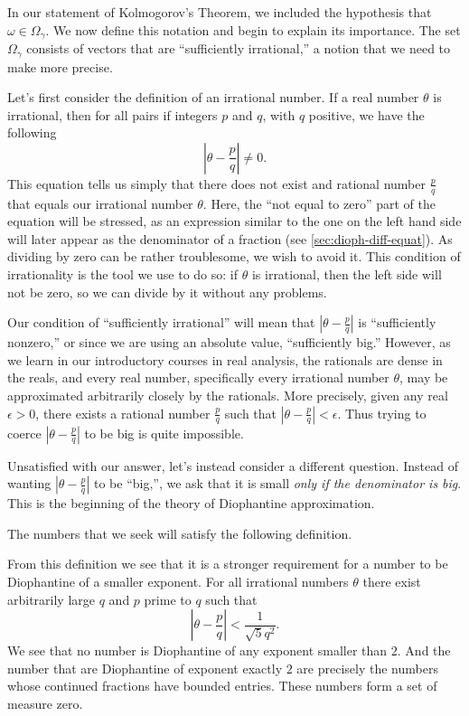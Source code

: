 \documentclass[twoside,letterpaper,10pt]{article}
\begin{document}
In our statement of Kolmogorov's Theorem, we included the hypothesis that
$\omega \in \Omega_{\gamma}$.
We now define this notation and begin to explain its importance.
The set $\Omega_{\gamma}$ consists of vectors that are ``sufficiently
irrational,'' a notion that we need to make more precise.

Let's first consider the definition of an irrational number.
If a real number $\theta$ is irrational, then for all pairs if integers $p$ and
$q$, with $q$ positive, we have the following
\begin{equation*}
  \left| \theta - \frac{p}{q} \right| \neq 0.
\end{equation*}
This equation tells us simply that there does not exist and rational number
$\frac{p}{q}$ that equals our irrational number $\theta$.
Here, the ``not equal to zero'' part of the equation will be stressed, as an
expression similar to the one on the left hand side will later appear as the
denominator of a fraction (see \cref{sec:dioph-diff-equat}).
As dividing by zero can be rather troublesome, we wish to avoid it.
This condition of irrationality is the tool we use to do so: if $\theta$ is
irrational, then the left side will not be zero, so we can divide by it without
any problems.

Our condition of ``sufficiently irrational'' will mean that $\left| \theta -
  \frac{p}{q} \right|$ is ``sufficiently nonzero,'' or since we are using an
absolute value, ``sufficiently big.''
However, as we learn in our introductory courses in real analysis, the rationals
are dense in the reals, and every real number, specifically every irrational
number $\theta$, may be approximated arbitrarily closely by the rationals.
More precisely, given any real $\epsilon > 0$, there exists a rational number
$\frac{p}{q}$ such that $\left| \theta - \frac{p}{q} \right| < \epsilon$.
Thus trying to coerce $\left| \theta - \frac{p}{q} \right|$ to be big is quite
impossible.

Unsatisfied with our answer, let's instead consider a different question.
Instead of wanting $\left| \theta - \frac{p}{q} \right|$ to be ``big,'', we ask
that it is small \emph{only if the denominator is big}.
This is the beginning of the theory of Diophantine approximation.

The numbers that we seek will satisfy the following definition.
\begin{defn}
  \dionumber{}
\end{defn}
From this definition we see that it is a stronger requirement for a number to be
Diophantine of a smaller exponent.
For all irrational numbers $\theta$ there exist arbitrarily large $q$ and $p$
prime to $q$ such that
\begin{equation*}
  \left| \theta - \frac{p}{q} \right| < \frac{1}{\sqrt{5}q^2}.
\end{equation*}
We see that no number is Diophantine of any exponent smaller than $2$.
And the number that are Diophantine of exponent exactly $2$ are precisely the
numbers whose continued fractions have bounded entries.
These numbers form a set of measure zero.
\end{document}
